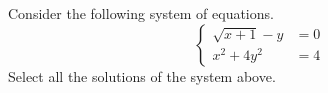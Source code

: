 \documentclass{ximera}
\author{Kenneth Berglund}
\begin{document}
\licenseSZ
\begin{exercise}
Consider the following system of equations.
$$
\begin{cases}
\sqrt{x + 1} - y & = 0 \\
x^2 + 4y^2 & = 4
\end{cases}
$$
Select all the solutions of the system above.
\begin{selectAll}
\end{selectAll}

\end{exercise}
\end{document}
